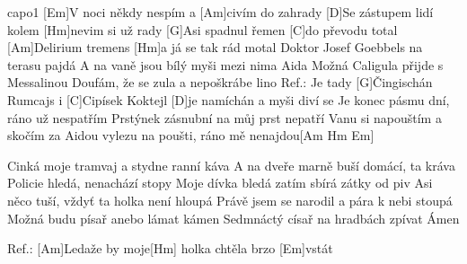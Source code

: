 \hfill capo1
[Em]V noci někdy nespím a [Am]civím do zahrady
[D]Se zástupem lidí kolem [Hm]nevim si už rady
[G]Asi spadnul řemen [C]do převodu total
[Am]Delirium tremens [Hm]a já se tak rád motal
Doktor Josef Goebbels na terasu pajdá
A na vaně jsou bílý myši mezi nima Aida
Možná Caligula přijde s Messalinou
Doufám, že se zula a nepoškrábe lino
Ref.: Je tady [G]\null Čingischán Rumcajs i [C]Cipísek
Koktejl [D]je namíchán a myši diví se
Je konec pásmu dní, ráno už nespatřím
Prstýnek zásnubní na můj prst nepatří
Vanu si napouštím a skočím za Aidou
vylezu na poušti,
ráno mě nenajdou[Am Hm Em]

Cinká moje tramvaj a stydne ranní káva
A na dveře marně buší domácí, ta kráva
Policie hledá, nenachází stopy
Moje dívka bledá zatím sbírá zátky od piv
Asi něco tuší, vždyť ta holka není hloupá
Právě jsem se narodil a pára k nebi stoupá
Možná budu písař anebo lámat kámen
Sedmnáctý císař na hradbách zpívat Ámen

Ref.: 
[Am]Ledaže by moje[Hm] holka chtěla brzo [Em]vstát